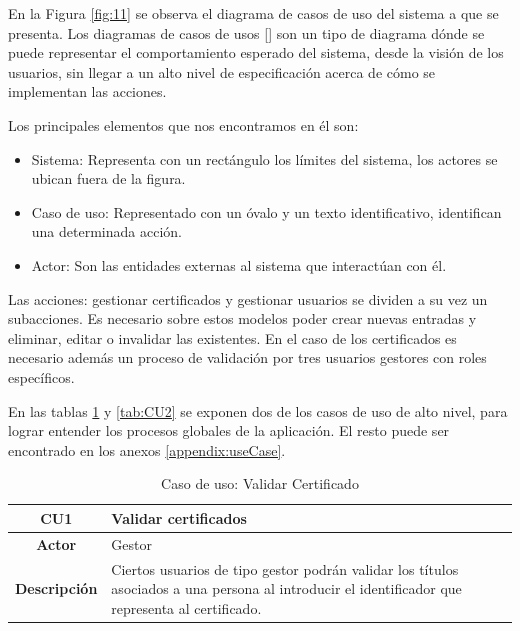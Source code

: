 En la Figura \ref{fig:11} se observa el diagrama de casos de uso del sistema a que se presenta. Los diagramas de casos de usos [\cite{91}] son un tipo de diagrama dónde se puede representar el comportamiento esperado del sistema, desde la visión de los usuarios, sin llegar a un alto nivel de especificación acerca de cómo se implementan las acciones. 

Los principales elementos que nos encontramos en él son:
\begin{itemize}
	\item Sistema: Representa con un rectángulo los límites del sistema, los actores se ubican fuera de la figura.
	\item Caso de uso: Representado con un óvalo y un texto identificativo, identifican una determinada acción.
	\item Actor: Son las entidades externas al sistema que interactúan con él.
\end{itemize}

Las acciones: gestionar certificados y gestionar usuarios se dividen a su vez un subacciones. Es necesario sobre estos modelos poder crear nuevas entradas y eliminar, editar o invalidar las existentes. En el caso de los certificados es necesario además un proceso de validación por tres usuarios gestores con roles específicos.

En las tablas \ref{tab:CU1} y \ref{tab:CU2} se exponen dos de los casos de uso de alto nivel, para lograr entender los procesos globales de la aplicación. El resto puede ser encontrado en los anexos \ref{appendix:useCase}.

\begin{table}[!h]
	\begin{center}
		\begin{tabular}{|c|p{10cm}|}
			\hline \textbf{CU1} & Validar certificados \\ 
			\hline \textbf{Actor} & Gestor \\ 
			\hline \textbf{Descripción} & Ciertos usuarios de tipo gestor podrán validar los títulos asociados a una persona al introducir el identificador que representa al certificado.  \\ 
			\hline 
		\end{tabular}
		\caption{Caso de uso: Validar Certificado}
		\label{tab:CU1}
	\end{center}
\end{table}

